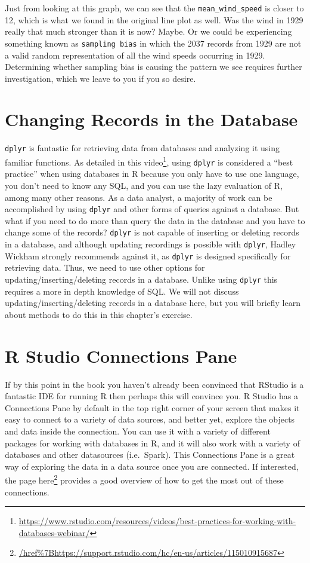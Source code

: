 \documentclass[]{krantz}
\renewcommand{\href}[2]{#2\footnote{\url{#1}}}
\begin{document}
Just from looking at this graph, we can see that the \texttt{mean\_wind\_speed} is closer to 12, which is what we found in the original line plot as well. Was the wind in 1929 really that much stronger than it is now? Maybe. Or we could be experiencing something known as \texttt{sampling\ bias} in which the 2037 records from 1929 are not a valid random representation of all the wind speeds occurring in 1929. Determining whether sampling bias is causing the pattern we see requires further investigation, which we leave to you if you so desire.

\hypertarget{changing-records-in-the-database}{%
\section{Changing Records in the Database}\label{changing-records-in-the-database}}

\texttt{dplyr} is fantastic for retrieving data from databases and analyzing it using familiar functions. As detailed in this \href{https://www.rstudio.com/resources/videos/best-practices-for-working-with-databases-webinar/}{video}, using \texttt{dplyr} is considered a ``best practice'' when using databases in R because you only have to use one language, you don't need to know any SQL, and you can use the lazy evaluation of R, among many other reasons. As a data analyst, a majority of work can be accomplished by using \texttt{dplyr} and other forms of queries against a database. But what if you need to do more than query the data in the database and you have to change some of the records? \texttt{dplyr} is not capable of inserting or deleting records in a database, and although updating recordings is possible with \texttt{dplyr}, Hadley Wickham strongly recommends against it, as \texttt{dplyr} is designed specifically for retrieving data. Thus, we need to use other options for updating/inserting/deleting records in a database. Unlike using \texttt{dplyr} this requires a more in depth knowledge of SQL. We will not discuss updating/inserting/deleting records in a database here, but you will briefly learn about methods to do this in this chapter's exercise.

\hypertarget{r-studio-connections-pane}{%
\section{R Studio Connections Pane}\label{r-studio-connections-pane}}

If by this point in the book you haven't already been convinced that RStudio is a fantastic IDE for running R then perhaps this will convince you. R Studio has a Connections Pane by default in the top right corner of your screen that makes it easy to connect to a variety of data sources, and better yet, explore the objects and data inside the connection. You can use it with a variety of different packages for working with databases in R, and it will also work with a variety of databases and other datasources (i.e.~Spark). This Connections Pane is a great way of exploring the data in a data source once you are connected. If interested, the page \href{/href\%7Bhttps://support.rstudio.com/hc/en-us/articles/115010915687}{here} provides a good overview of how to get the most out of these connections.
\end{document}

